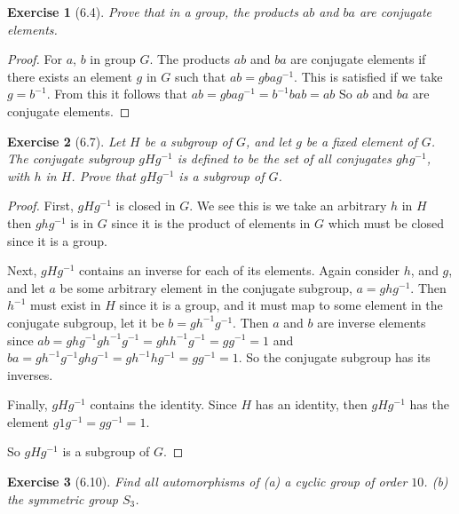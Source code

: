 \documentclass[12pt,leqno]{article}
\numberwithin{equation}{section}
\newtheorem*{exer}{Exercise}
\theoremstyle{definition}
\begin{document}
\begin{exer}[6.4]Prove that in a group, the products $ab$ and $ba$ are conjugate elements.
\end{exer}

\begin{proof}[Proof]

    For $a$, $b$ in group $G$. The products $ab$ and $ba$ are conjugate
    elements if there exists an element $g$ in $G$ such that $ab = gbag^{-1}$.
    This is satisfied if we take $g = b^{-1}$. From this it follows that $ab =
    gbag^{-1} = b^{-1}bab = ab$ So $ab$ and $ba$ are conjugate elements.

\end{proof}


\begin{exer}[6.7]
Let $H$ be a subgroup of $G$, and let $g$ be a fixed element of $G$. The
\emph{conjugate subgroup} $gHg^{-1}$ is defined to be the set of all conjugates
$ghg^{-1}$, with $h$ in $H$. Prove that $gHg^{-1}$ is a subgroup of $G$. 
\end{exer}

\begin{proof}[Proof]

    First, $gHg^{-1}$ is closed in $G$. We see this is we take an arbitrary $h$
    in $H$ then $ghg^{-1}$ is in $G$ since it is the product of elements in $G$
    which must be closed since it is a group.

    Next, $gHg^{-1}$ contains an inverse for each of its elements. Again
    consider $h$, and $g$, and let $a$ be some arbitrary element in the
    conjugate subgroup, $a = ghg^{-1}$. Then $h^{-1}$ must exist in $H$ since
    it is a group, and it must map to some element in the conjugate subgroup,
    let it be $b = gh^{-1}g^{-1}$. Then $a$ and $b$ are inverse elements since
    $ab = ghg^{-1}gh^{-1}g^{-1} = ghh^{-1}g^{-1} = gg^{-1} = 1$ and $ba =
    gh^{-1}g^{-1}ghg^{-1} = gh^{-1}hg^{-1} = gg^{-1} = 1$. So the conjugate
    subgroup has its inverses.

    Finally, $gHg^{-1}$ contains the identity. Since $H$ has an identity, then
    $gHg^{-1}$ has the element $g1g^{-1} = gg^{-1} = 1$. 

    So $gHg^{-1}$ is a subgroup of $G$.

\end{proof}


\begin{exer}[6.10]Find all automorphisms of (a) a cyclic group of order $10$.
    (b) the symmetric group $S_3$.

\end{exer}
\end{document}
